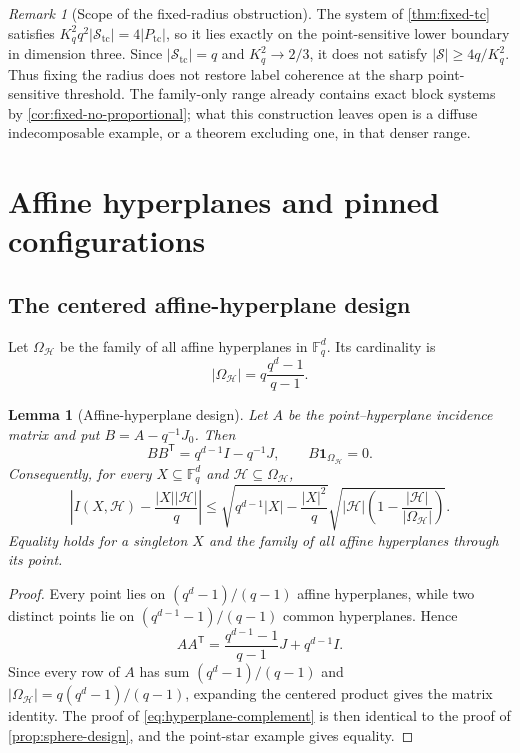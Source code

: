 \documentclass[11pt,letterpaper]{amsart}
\newtheorem{lemma}[lemma]{Lemma}
\theoremstyle{definition}
\theoremstyle{remark}
\newtheorem{remark}[remark]{Remark}
\newcommand{\1}{\mathbf 1}
\begin{document}
\begin{remark}[Scope of the fixed-radius obstruction]\label{rem:tc-lower-range}
The system of \cref{thm:fixed-tc} satisfies $K_q^2q^2|\mathcal S_{\mathrm{tc}}|=4|P_{\mathrm{tc}}|$, so it lies exactly on the point-sensitive lower boundary in dimension three.  Since $|\mathcal S_{\mathrm{tc}}|=q$ and $K_q^2\to2/3$, it does not satisfy $|\mathcal S|\ge4q/K_q^2$.  Thus fixing the radius does not restore label coherence at the sharp point-sensitive threshold.  The family-only range already contains exact block systems by \cref{cor:fixed-no-proportional}; what this construction leaves open is a diffuse indecomposable example, or a theorem excluding one, in that denser range.
\end{remark}

\section{Affine hyperplanes and pinned configurations}\label{sec:applications}

\subsection{The centered affine-hyperplane design}

Let $\Omega_{\mathcal H}$ be the family of all affine hyperplanes in $\mathbb F_q^d$.  Its cardinality is
\[
 |\Omega_{\mathcal H}|=q\frac{q^d-1}{q-1}.
\]

\begin{lemma}[Affine-hyperplane design]\label{lem:hyperplane-design}
Let $A$ be the point--hyperplane incidence matrix and put $B=A-q^{-1}J_0$.  Then
\[
 BB^{\mathsf T}=q^{d-1}I-q^{-1}J,
 \qquad B\mathbf 1_{\Omega_{\mathcal H}}=0.
\]
Consequently, for every $X\subseteq\mathbb F_q^d$ and $\mathcal H\subseteq\Omega_{\mathcal H}$,
\begin{equation}\label{eq:hyperplane-complement}
 \left|I(X,\mathcal H)-\frac{|X||\mathcal H|}{q}\right|
 \le
 \sqrt{q^{d-1}|X|-\frac{|X|^2}{q}}
 \sqrt{|\mathcal H|\left(1-\frac{|\mathcal H|}{|\Omega_{\mathcal H}|}\right)}.
\end{equation}
Equality holds for a singleton $X$ and the family of all affine hyperplanes through its point.
\end{lemma}

\begin{proof}
Every point lies on $(q^d-1)/(q-1)$ affine hyperplanes, while two distinct points lie on $(q^{d-1}-1)/(q-1)$ common hyperplanes.  Hence
\[
 AA^{\mathsf T}=\frac{q^{d-1}-1}{q-1}J+q^{d-1}I.
\]
Since every row of $A$ has sum $(q^d-1)/(q-1)$ and $|\Omega_{\mathcal H}|=q(q^d-1)/(q-1)$, expanding the centered product gives the matrix identity.  The proof of \eqref{eq:hyperplane-complement} is then identical to the proof of \cref{prop:sphere-design}, and the point-star example gives equality.
\end{proof}
\end{document}
